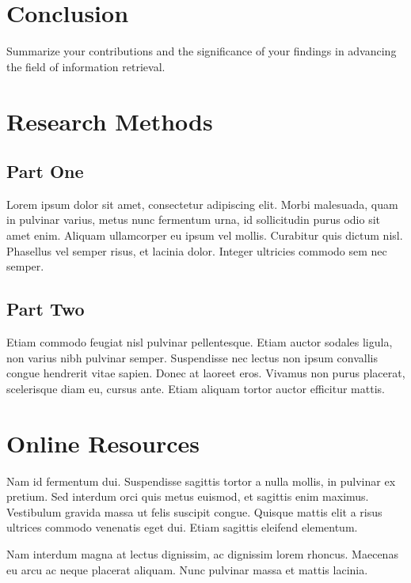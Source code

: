 \documentclass[acmtog, authorversion]{acmart}
\begin{document}
\section{Conclusion}  
\label{sec:conclusion}  
Summarize your contributions and the significance of your findings in advancing the field of information retrieval.  





\appendix

\section{Research Methods}

\subsection{Part One}

Lorem ipsum dolor sit amet, consectetur adipiscing elit. Morbi
malesuada, quam in pulvinar varius, metus nunc fermentum urna, id
sollicitudin purus odio sit amet enim. Aliquam ullamcorper eu ipsum
vel mollis. Curabitur quis dictum nisl. Phasellus vel semper risus, et
lacinia dolor. Integer ultricies commodo sem nec semper.

\subsection{Part Two}

Etiam commodo feugiat nisl pulvinar pellentesque. Etiam auctor sodales
ligula, non varius nibh pulvinar semper. Suspendisse nec lectus non
ipsum convallis congue hendrerit vitae sapien. Donec at laoreet
eros. Vivamus non purus placerat, scelerisque diam eu, cursus
ante. Etiam aliquam tortor auctor efficitur mattis.

\section{Online Resources}

Nam id fermentum dui. Suspendisse sagittis tortor a nulla mollis, in
pulvinar ex pretium. Sed interdum orci quis metus euismod, et sagittis
enim maximus. Vestibulum gravida massa ut felis suscipit
congue. Quisque mattis elit a risus ultrices commodo venenatis eget
dui. Etiam sagittis eleifend elementum.

Nam interdum magna at lectus dignissim, ac dignissim lorem
rhoncus. Maecenas eu arcu ac neque placerat aliquam. Nunc pulvinar
massa et mattis lacinia.
\end{document}

